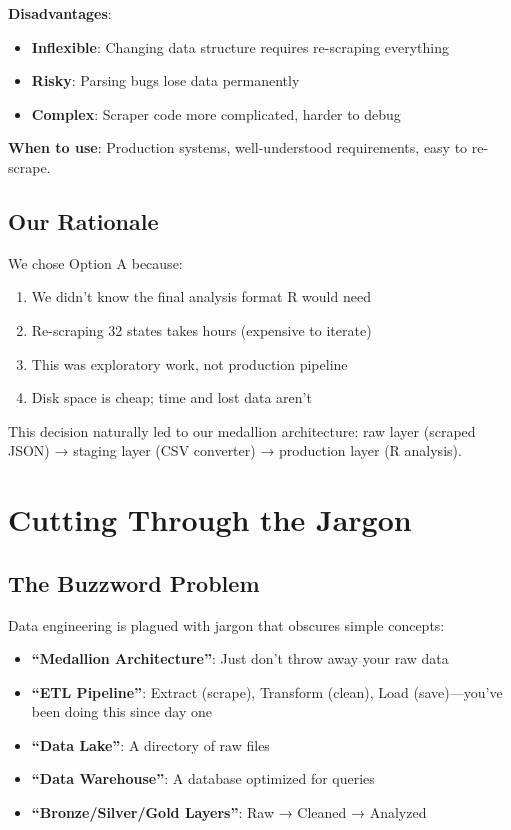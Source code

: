 \documentclass[11pt,a4paper]{article}
\begin{document}
\textbf{Disadvantages}:
\begin{itemize}
    \item \textbf{Inflexible}: Changing data structure requires re-scraping everything
    \item \textbf{Risky}: Parsing bugs lose data permanently
    \item \textbf{Complex}: Scraper code more complicated, harder to debug
\end{itemize}

\textbf{When to use}: Production systems, well-understood requirements, easy to re-scrape.

\subsection{Our Rationale}

We chose Option A because:

\begin{enumerate}
    \item We didn't know the final analysis format R would need
    \item Re-scraping 32 states takes hours (expensive to iterate)
    \item This was exploratory work, not production pipeline
    \item Disk space is cheap; time and lost data aren't
\end{enumerate}

This decision naturally led to our medallion architecture: raw layer (scraped JSON) → staging layer (CSV converter) → production layer (R analysis).

\section{Cutting Through the Jargon}

\subsection{The Buzzword Problem}

Data engineering is plagued with jargon that obscures simple concepts:

\begin{itemize}
    \item \textbf{``Medallion Architecture''}: Just don't throw away your raw data
    \item \textbf{``ETL Pipeline''}: Extract (scrape), Transform (clean), Load (save)—you've been doing this since day one
    \item \textbf{``Data Lake''}: A directory of raw files
    \item \textbf{``Data Warehouse''}: A database optimized for queries
    \item \textbf{``Bronze/Silver/Gold Layers''}: Raw → Cleaned → Analyzed
\end{itemize}
\end{document}
